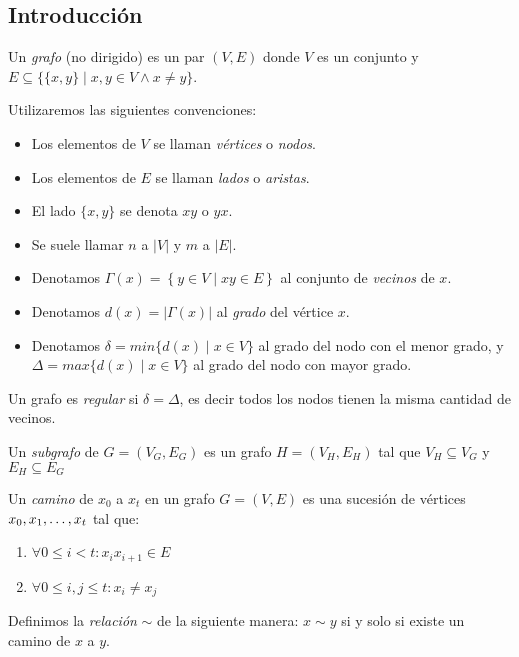 \subsection{Introducción}

\begin{definition}
  Un \emph{grafo} (no dirigido) es un par $(V, E)$ donde $V$ es un conjunto y
  $E \subseteq \{\{x,y\} \mid x,y \in V \wedge x \neq y \}$.
\end{definition}

\begin{notation} Utilizaremos las siguientes convenciones:
  \begin{itemize}
  \item[] Los elementos de $V$ se llaman \emph{vértices} o \emph{nodos}.

  \item[] Los elementos de $E$ se llaman \emph{lados} o \emph{aristas}.

  \item[] El lado $\{x,y\}$ se denota $xy$ o $yx$.

  \item[] Se suele llamar $n$ a $|V|$ y $m$ a $|E|$.

  \item[] Denotamos $\Gamma(x) = \left\{y \in V \mid xy \in E \right\}$ al conjunto de
    \emph{vecinos} de $x$.

  \item[] Denotamos $d(x) = |\Gamma(x)|$ al \emph{grado} del vértice $x$.

  \item[] Denotamos $\delta = min\{d(x) \mid x\in V\}$ al grado del nodo con el menor
    grado, y $\Delta = max\{d(x) \mid x\in V\}$ al grado del nodo con mayor grado.
  \end{itemize}
\end{notation}

\begin{definition}
  Un grafo es \emph{regular} si $\delta = \Delta$, es decir todos los nodos
  tienen la misma cantidad de vecinos.
\end{definition}

\begin{definition}
  Un \emph{subgrafo} de $G = (V_G,E_G)$ es un grafo $H = (V_H,E_H)$ tal que 
  $V_H \subseteq V_G$ y $E_H \subseteq E_G$
\end{definition}

\begin{definition}
  Un \emph{camino} de $x_0$ a $x_t$ en un grafo $G = (V,E)$ es una sucesión de
  vértices $x_0, x_1, \mathellipsis, x_t$ tal que:
\begin{enumerate}
    \item $\forall 0 \le i < t \colon x_i x_{i+1} \in E$
    \item $\forall 0 \le i, j \le t \colon x_i \neq x_j$
\end{enumerate}
Definimos la \emph{relación} $\sim$ de la siguiente manera: $x \sim y$ si y
solo si existe un camino de $x$ a $y$.
\end{definition}

